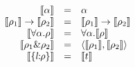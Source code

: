 
\[
\begin{array}{rcl}
  \image \alpha                 & = & \alpha \\
  \image {\ty_1} \to \image {\ty_2}  & = & \image {\ty_1} \to \image {\ty_2} \\
  \image {\forall \alpha. \ty}    & = & \forall \alpha. \image \ty \\
  \image {\ty_1 \& \ty_2}           & = & \tupled {\image {\ty_1}, \image {\ty_2}} \\
  \image {\recordtype l \ty}          & = & \image t
\end{array}
\]